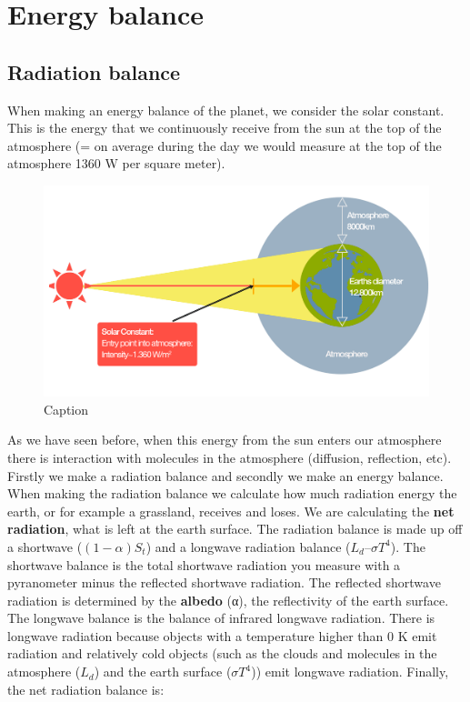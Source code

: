 \documentclass[12pt,oneside]{book}
\begin{document}
\section{Energy balance}\label{energy-balance}

\subsection{Radiation balance}\label{radiation-balance}

When making an energy balance of the planet, we consider the solar
constant. This is the energy that we continuously receive from the sun
at the top of the atmosphere (= on average during the day we would
measure at the top of the atmosphere 1360 W per square meter).

\begin{figure}

{\centering \includegraphics[width=0.6\linewidth]{figures/Figure133} 

}

\caption{Caption}\label{fig:RadBalance}
\end{figure}

As we have seen before, when this energy from the sun enters our
atmosphere there is interaction with molecules in the atmosphere
(diffusion, reflection, etc). Firstly we make a radiation balance and
secondly we make an energy balance. When making the radiation balance we
calculate how much radiation energy the earth, or for example a
grassland, receives and loses. We are calculating the \textbf{net
radiation}, what is left at the earth surface. The radiation balance is
made up off a shortwave (\((1-α) S_t\)) and a longwave radiation balance
(\(L_d – σ T^4\)). The shortwave balance is the total shortwave
radiation you measure with a pyranometer minus the reflected shortwave
radiation. The reflected shortwave radiation is determined by the
\textbf{albedo} (α), the reflectivity of the earth surface. The longwave
balance is the balance of infrared longwave radiation. There is longwave
radiation because objects with a temperature higher than 0 K emit
radiation and relatively cold objects (such as the clouds and molecules
in the atmosphere (\(L_d\)) and the earth surface (\(σ T^4\))) emit
longwave radiation. Finally, the net radiation balance is:
\end{document}
